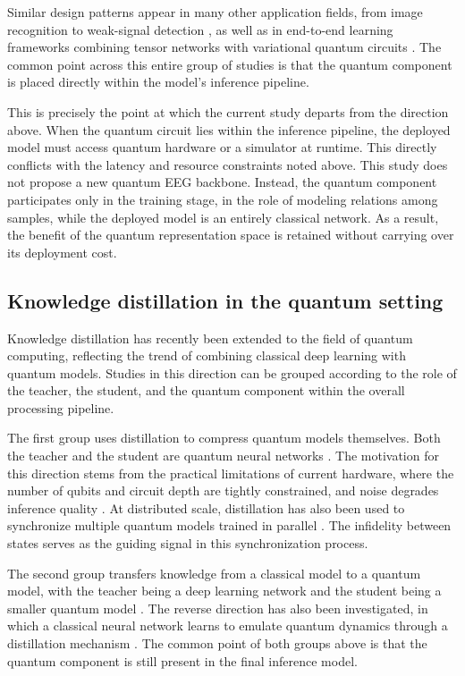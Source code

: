 Similar design patterns appear in many other application fields, from
image recognition \cite{wang2022development} to weak-signal detection
\cite{griol-barres2021variational}, as well as in end-to-end learning
frameworks combining tensor networks with variational quantum
circuits \cite{qi2024qtnvqc}. The common point across this entire
group of studies is that the quantum component is placed directly
within the model's inference pipeline.

This is precisely the point at which the current study departs from
the direction above. When the quantum circuit lies within the
inference pipeline, the deployed model must access quantum hardware
or a simulator at runtime. This directly conflicts with the latency
and resource constraints noted above. This study does not propose a
new quantum EEG backbone. Instead, the quantum component participates
only in the training stage, in the role of modeling relations among
samples, while the deployed model is an entirely classical network.
As a result, the benefit of the quantum representation space is
retained without carrying over its deployment cost.

\subsection{Knowledge distillation in the quantum setting}
\label{sec:qkd}

Knowledge distillation has recently been extended to the field of
quantum computing, reflecting the trend of combining classical deep
learning with quantum models. Studies in this direction can be
grouped according to the role of the teacher, the student, and the
quantum component within the overall processing pipeline.

The first group uses distillation to compress quantum models
themselves. Both the teacher and the student are quantum neural
networks \cite{yan2026distilling}. The motivation for this direction
stems from the practical limitations of current hardware, where the
number of qubits and circuit depth are tightly constrained, and noise
degrades inference quality \cite{alam2022qnet}. At distributed scale,
distillation has also been used to synchronize multiple quantum
models trained in parallel \cite{oh2025quantum}. The infidelity
between states serves as the guiding signal in this synchronization
process.

The second group transfers knowledge from a classical model to a
quantum model, with the teacher being a deep learning network and the
student being a smaller quantum model \cite{nishan2026quantummedkd,
li2025quantum}. The reverse direction has also been investigated, in
which a classical neural network learns to emulate quantum dynamics
through a distillation mechanism \cite{yao2023emulating}. The common
point of both groups above is that the quantum component is still
present in the final inference model.

